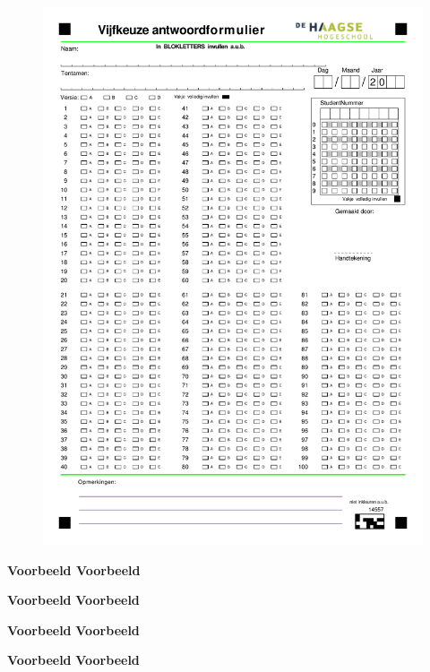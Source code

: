 \documentclass[a4paper,12pt,fleqn,dutch]{tisdexam}
\begin{document}
\begin{figure}[h!]
  \centering
  \includegraphics*[viewport=0 0 600 200,scale=0.80]{vijfkeuze_nl.pdf}
\end{figure}

{\fontsize{11pt}{12pt}\selectfont\bfseries
{}
\par}

\vspace*{-10cm}
{\fontsize{11pt}{12pt}\selectfont\bfseries
\Huge{\textbf{Voorbeeld}}
\Huge{\textbf{Voorbeeld}}

\Huge{\textbf{Voorbeeld}}
\Huge{\textbf{Voorbeeld}}

\Huge{\textbf{Voorbeeld}}
\Huge{\textbf{Voorbeeld}}

\Huge{\textbf{Voorbeeld}}
\Huge{\textbf{Voorbeeld}}
\par}
\newpage
\end{document}
